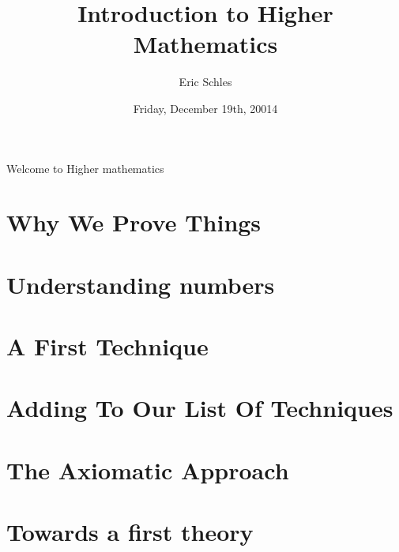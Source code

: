 \documentclass{book}
\title{Introduction to Higher Mathematics}
\author{Eric Schles}
\date{ Friday, December 19th, 20014}
\begin{document}
\maketitle
Welcome to Higher mathematics
\tableofcontents
\chapter{Why We Prove Things}
\chapter{Understanding numbers}
\chapter{A First Technique}
\chapter{Adding To Our List Of Techniques}
\chapter{The Axiomatic Approach}
\chapter{Towards a first theory}
\end{document}
